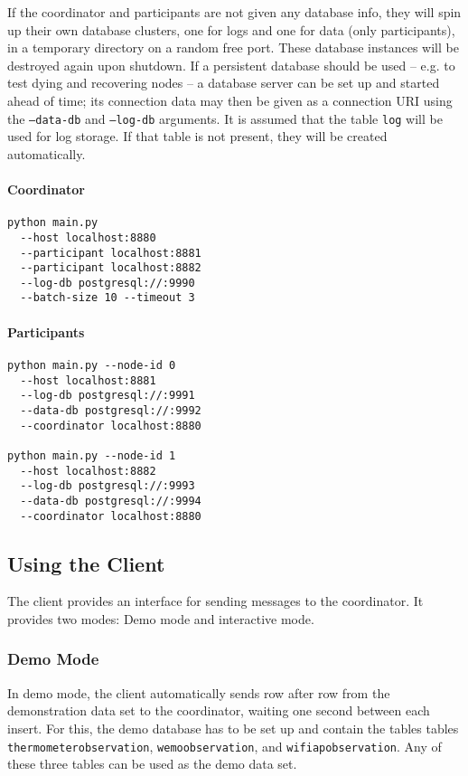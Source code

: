 \documentclass{article}
\begin{document}
\begin{multicols}{2}
If the coordinator and participants are not given any
database info, they will spin up their own database clusters,
one for logs and one for data (only participants), in a 
temporary directory on a random free port. These database
instances will be destroyed again upon shutdown. If a
persistent database should be used -- e.g. to test dying and
recovering nodes -- a database server can be set up and
started ahead of time; its connection data may then be given
as a connection URI using the \texttt{--data-db} and
\texttt{--log-db} arguments. It is assumed that the table
\texttt{log} will be used for log storage. If that table
is not present, they will be created automatically.

\paragraph{Coordinator}

\begin{verbatim}
python main.py
  --host localhost:8880
  --participant localhost:8881
  --participant localhost:8882
  --log-db postgresql://:9990
  --batch-size 10 --timeout 3
\end{verbatim}

\paragraph{Participants}

\begin{verbatim}
python main.py --node-id 0
  --host localhost:8881
  --log-db postgresql://:9991
  --data-db postgresql://:9992
  --coordinator localhost:8880

python main.py --node-id 1
  --host localhost:8882
  --log-db postgresql://:9993
  --data-db postgresql://:9994
  --coordinator localhost:8880
\end{verbatim}

\subsection{Using the Client}

The client provides an interface for sending messages to
the coordinator. It provides two modes: Demo mode and 
interactive mode.

\subsubsection{Demo Mode}

In demo mode, the client automatically sends row after row
from the demonstration data set to the coordinator, waiting
one second between each insert. For this, the demo database
has to be set up and contain the tables tables 
\texttt{thermometerobservation}, \texttt{wemoobservation},
and \texttt{wifiapobservation}. Any of these three tables
 can be used as the demo data set.
 

\end{multicols}
\end{document}
